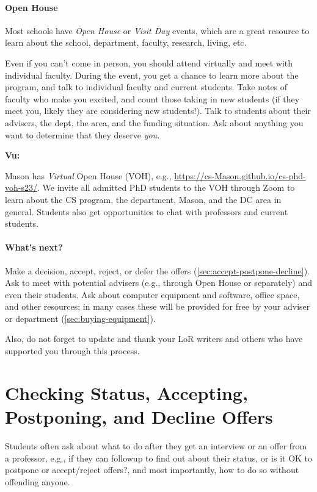 \documentclass[oneside,11pt,dvipsnames]{book}
\newenvironment{commentbox}[1][]{
  \small
  \begin{mybox}
    {\small \textbf{#1}}
  }{
  \end{mybox}
}
\begin{document}
\paragraph{Open House} Most schools have \emph{Open House} or \emph{Visit Day} events, which are a great resource to learn about the school, department, faculty, research, living, etc.

Even if you can't come in person, you should attend virtually and meet with individual faculty. During the event, you get a chance to learn more about the program, and talk to individual faculty and current students.  Take notes of faculty who make you excited, and count those taking in new students (if they meet you, likely they are considering new students!).  Talk to students about their advisers, the dept, the area, and the funding situation.  Ask about anything you want to determine that they deserve \emph{you}.

\begin{commentbox}[Vu:]
  Mason has \emph{Virtual} Open House (VOH), e.g., \url{https://cs-Mason.github.io/cs-phd-voh-s23/}. We invite all admitted PhD students to the VOH through Zoom to learn about the CS program, the department, Mason, and the DC area in general. Students also get opportunities to chat with professors and current students.
\end{commentbox}

\paragraph{What's next?} Make a decision, accept, reject, or defer the offers  (\autoref{sec:accept-postpone-decline}). Ask to meet with potential advisers (e.g., through Open House or separately) and even their students. Ask about computer equipment and software, office space, and other resources; in many cases these will be provided for free by your adviser or department (\autoref{sec:buying-equipment}).

Also, do not forget to update and thank your LoR writers and others who have supported you through this process.


\section{Checking Status, Accepting, Postponing, and Decline Offers}\label{sec:accept-postpone-decline}

Students often ask about what to do after they get an interview or an offer from a professor, e.g., if they can followup to find out about their status, or is it OK to postpone or accept/reject offers?, and most importantly, how to do so without offending anyone. 
\end{document}
